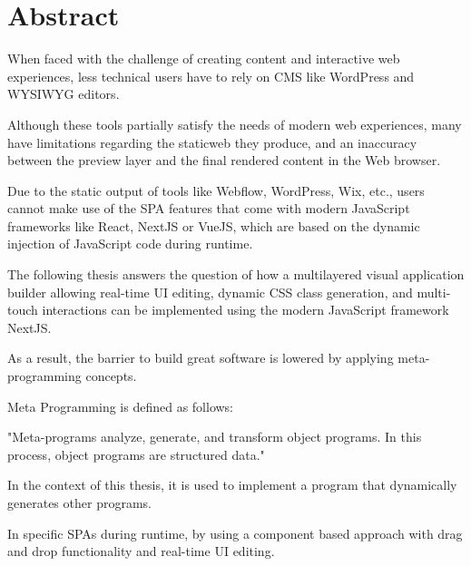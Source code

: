 \documentclass[oneside,12pt]{book}
\begin{document}
\newpage

\chapter*{Abstract}\thispagestyle{empty}
When faced with the challenge of creating content and interactive web experiences, less technical users have to rely on \gls{CMS} like WordPress and \gls{WYSIWYG} editors.

Although these tools partially satisfy the needs of modern web experiences, many have limitations regarding the \gls{staticweb} they produce, and an inaccuracy between the preview layer and the final rendered content in the Web browser.

Due to the static output of tools like Webflow, WordPress, Wix, etc., users cannot make use of the \gls{SPA} features that come with modern JavaScript frameworks like React, NextJS or VueJS, which are based on the dynamic injection of JavaScript code during \gls{runtime}.

The following thesis answers the question of how a multilayered visual application builder allowing real-time \gls{UI} editing, dynamic CSS class generation, and multi-touch interactions can be implemented using the modern JavaScript framework NextJS. 

As a result, the barrier to build great software is lowered by applying meta-programming concepts.

Meta Programming is defined as follows:

"Meta-programs analyze, generate, and transform object programs. In this process, object programs are structured data."

In the context of this thesis, it is used to implement a program that dynamically generates other programs.

In specific SPAs during \gls{runtime}, by using a component based approach with drag and drop functionality and real-time \gls{UI} editing.

\newpage

\pagestyle{frontmatter}
\setcounter{page}{1}

\tableofcontents

\newpage
\listoffigures
\end{document}
